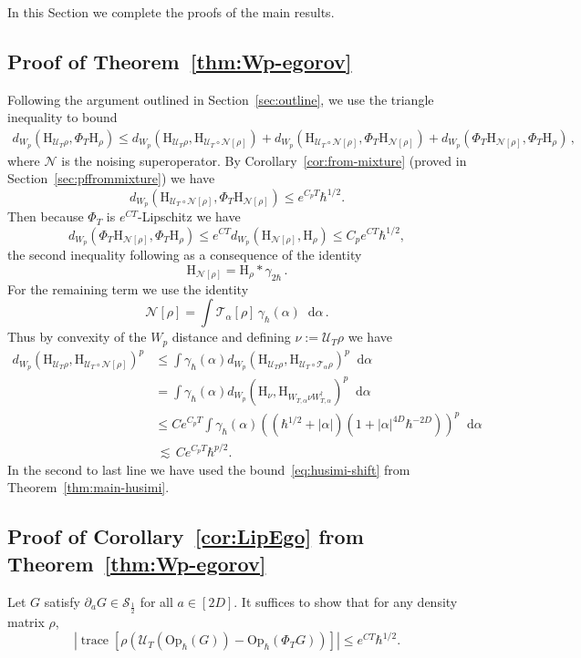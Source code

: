 \documentclass[11pt]{amsart}
\def\Husimi{{\mathrm{H}}}
\def\Op{\mathrm{Op}}
\def\trace{\operatorname*{trace}}
\newcommand{\diff}{\mathop{}\!\mathrm{d}}
\def\lsim{{\,\lesssim\,}}
\newcommand{\mcal}[1]{{\mathcal{#1}}}
\numberwithin{equation}{section}
\begin{document}
In this Section we complete the proofs of the main results.

\subsection{Proof of Theorem~\ref{thm:Wp-egorov}}

Following the argument outlined in Section~\ref{sec:outline}, we use the triangle inequality to bound
\begin{align*}
d_{W_p} (\Husimi_{\mcal{U}_T\rho}, \Phi_T \Husimi_\rho)
\leq
d_{W_p} (\Husimi_{\mcal{U}_T\rho}, \Husimi_{\mcal{U}_T\circ\mcal{N}[\rho]})
+
d_{W_p} (\Husimi_{\mcal{U}_T\circ\mcal{N}[\rho]}, \Phi_T \Husimi_{\mcal{N}[\rho]})
+
d_{W_p} (\Phi_T \Husimi_{\mcal{N}[\rho]}, \Phi_T \Husimi_\rho)\,,
\end{align*}
where $\mcal{N}$ is the noising superoperator.  By Corollary~\ref{cor:from-mixture} (proved in Section~\ref{sec:pffrommixture}) we have
\[
d_{W_p} (\Husimi_{\mcal{U}_T\circ\mcal{N}[\rho]}, \Phi_T \Husimi_{\mcal{N}[\rho]})
\leq e^{C_pT} \hbar^{1/2}.
\]
Then because $\Phi_T$ is $e^{CT}$-Lipschitz we have
\[
d_{W_p} (\Phi_T \Husimi_{\mcal{N}[\rho]}, \Phi_T \Husimi_\rho)
\leq e^{CT} d_{W_p} (\Husimi_{\mcal{N}[\rho]}, \Husimi_\rho)
\leq C_p e^{CT}\hbar^{1/2},
\]
the second inequality following as a consequence of the identity
\[
\Husimi_{\mcal{N}[\rho]} =  \Husimi_\rho \ast \gamma_{2\hbar}\,.
\]
For the remaining term we use the identity
\[
\mcal{N}[\rho] = \int \mcal{T}_\alpha[\rho]\, \gamma_\hbar(\alpha) \diff \alpha\,.
\]
Thus by convexity of the $W_p$ distance and defining $\nu := \mcal{U}_T\rho$ we have
\begin{align*}
d_{W_p} (\Husimi_{\mcal{U}_T\rho}, \Husimi_{\mcal{U}_T\circ\mcal{N}[\rho]})^p
&\leq
\int \gamma_\hbar(\alpha) d_{W_p}(\Husimi_{\mcal{U}_T\rho}, \Husimi_{\mcal{U}_T\circ \mcal{T}_\alpha \rho})^p \diff \alpha \\
&=
\int \gamma_\hbar(\alpha) d_{W_p}(\Husimi_{\nu}, \Husimi_{W_{T,\alpha} \nu W_{T,\alpha}^\dagger})^p \diff \alpha \\
&\leq C e^{C_p T}
\int \gamma_\hbar(\alpha) ((\hbar^{1/2} + |\alpha|) (1 + |\alpha|^{4D}\hbar^{-2D}))^p \diff \alpha \\
&\lsim  C e^{C_p T} \hbar^{p/2}.
\end{align*}
In the second to last line we have used the bound~\eqref{eq:husimi-shift} from Theorem~\ref{thm:main-husimi}.

\subsection{Proof of Corollary~\ref{cor:LipEgo} from Theorem~\ref{thm:Wp-egorov}}
\label{sec:corpf}
Let $G$ satisfy $\partial_a G\in\mcal{S}_{\frac12}$ for all $a\in[2D]$.
It suffices to show that for any density matrix $\rho$,
\begin{equation}
\label{eq:G-duality}
|\trace[\rho (\mcal{U}_T(\Op_\hbar(G)) - \Op_\hbar(\Phi_TG))]|\leq e^{CT} \hbar^{1/2}.
\end{equation}
\end{document}
